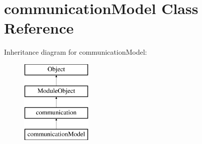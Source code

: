 \hypertarget{classcommunicationModel}{\section{communication\+Model Class Reference}
\label{classcommunicationModel}
}
Inheritance diagram for communication\+Model\+:\begin{figure}[H]
\begin{center}
\leavevmode
\includegraphics[height=4.000000cm]{classcommunicationModel}
\end{center}
\end{figure}
